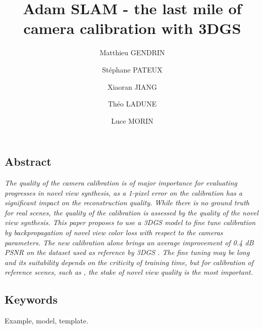 \documentclass[a4paper,twoside,french]{article}
\begin{document}
\date{}
\title{\Large\bf Adam SLAM - the last mile of camera calibration with 3DGS}
\author[1,2]{Matthieu GENDRIN}
\author[1]{Stéphane PATEUX}
\author[2]{Xiaoran JIANG}
\author[1]{Théo LADUNE}
\author[2]{Luce MORIN}
\maketitle
\subsection*{Abstract}
{\em
The quality of the camera calibration is of major importance for evaluating progresses in novel view synthesis,
as a 1-pixel error on the calibration has a significant impact on the reconstruction quality.
While there is no ground truth for real scenes, the quality of the calibration is assessed by the quality of the novel view synthesis.
This paper proposes to use a 3DGS \cite{kerbl20233d} model to fine tune calibration by backpropagation of novel view color loss with
respect to the cameras parameters. The new calibration alone brings an average improvement of 0.4 dB PSNR on the dataset used as reference by 3DGS \cite{kerbl20233d}.
The fine tuning may be long and its suitability depends on the criticity of training time, but for calibration
of reference scenes, such as \cite{barron2022mip}, the stake of novel view quality is the most important.
}
\subsection*{Keywords}
Example, model, template.
\end{document}
